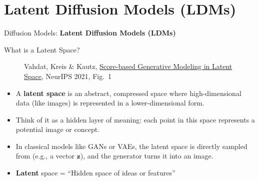 \section{Latent Diffusion Models (LDMs)}
\begin{frame}{}
    \LARGE Diffusion Models: \textbf{Latent Diffusion Models (LDMs)}
\end{frame}

\begin{frame}[allowframebreaks]{What is a Latent Space?}
    \begin{figure}
        \centering
        \caption*{\scriptsize Vahdat, Kreis \& Kautz, \href{https://arxiv.org/abs/2106.05931}{Score-based Generative Modeling in Latent Space}, NeurIPS 2021, Fig.~1}
    \end{figure}
    \begin{itemize}
        \setlength{\itemsep}{-0.5em}
        \item A \textbf{latent space} is an abstract, compressed space where high-dimensional data (like images) is represented in a lower-dimensional form.
        \item Think of it as a hidden layer of meaning: each point in this space represents a potential image or concept.
        \item In classical models like GANs or VAEs, the latent space is directly sampled from (e.g., a vector $\mathbf{z}$), and the generator turns it into an image.
        \item \textbf{Latent} space = ``Hidden space of ideas or features''
    \end{itemize}
\end{frame}

